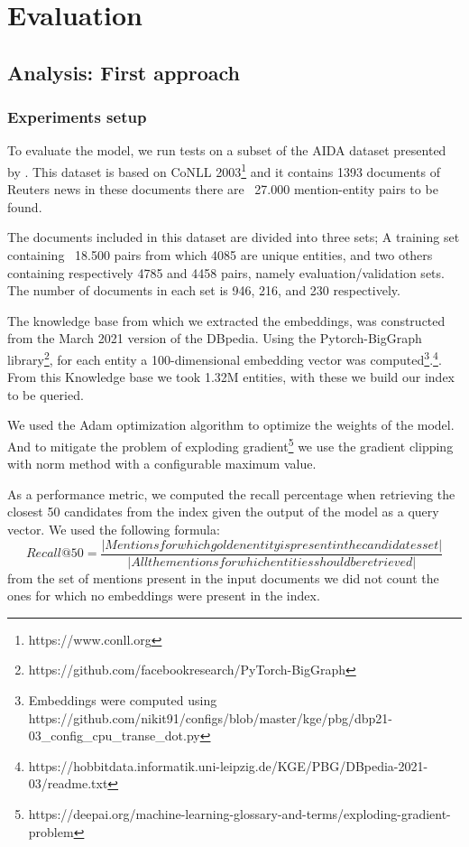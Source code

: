 \chapter{Evaluation}
\label{ch:Evaluation}

\section{Analysis: First approach}
\subsection{Experiments setup}
\label{exp}

To evaluate the model, we run tests on a subset of the AIDA dataset presented by \cite{hoffart-etal-2011-robust}. This dataset is based on CoNLL 2003\footnote{https://www.conll.org} and it contains 1393 documents of Reuters news in these documents there are ~27.000 mention-entity pairs to be found.

The documents included in this dataset are divided into three sets; A training set containing ~18.500 pairs from which 4085 are unique entities, and two others containing respectively 4785 and 4458 pairs, namely evaluation/validation sets. The number of documents in each set is 946, 216, and 230 respectively.\newline

The knowledge base from which we extracted the embeddings, was constructed from the March 2021 version of the DBpedia. Using the Pytorch-BigGraph library\footnote{https://github.com/facebookresearch/PyTorch-BigGraph}, for each entity a 100-dimensional embedding vector was computed\footnote{Embeddings were computed using https://github.com/nikit91/configs/blob/master/kge/pbg/dbp21-03\_config\_cpu\_transe\_dot.py}.\footnote{https://hobbitdata.informatik.uni-leipzig.de/KGE/PBG/DBpedia-2021-03/readme.txt}. From this Knowledge base we took 1.32M entities, with these we build our index to be queried. \newline

We used the Adam optimization algorithm\cite{ADAM} to optimize the weights of the model. And to mitigate the problem of exploding gradient\footnote{https://deepai.org/machine-learning-glossary-and-terms/exploding-gradient-problem} we use the gradient clipping with norm method with a configurable maximum value.\newline

As a performance metric, we computed the recall percentage when retrieving the closest 50 candidates from the index given the output of the model as a query vector.\newline
We used the following formula:
\begin{equation}
Recall@50 = \dfrac{|Mentions for which golden entity is present in the candidates set|}{|All the mentions for which entities should be retrieved|}
\end{equation}
from the set of mentions present in the input documents we did not count the ones for which no embeddings were present in the index.\newline


